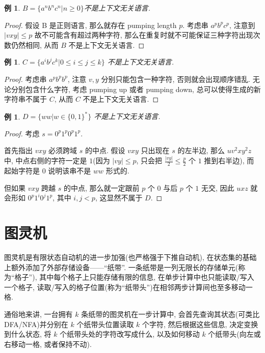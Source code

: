 \documentclass[8pt]{article}
\theoremstyle{compact}
\newtheorem{example}[theorem]{例}
\def\le{\leqslant}
\def\ge{\geqslant}
\begin{document}
\begin{example}
	$B = \{a^nb^nc^n | n \ge 0\}$不是上下文无关语言.
\end{example}
\begin{proof}
	假设 B 是正则语言, 那么就存在 pumping length $p$. 考虑串 $a^pb^pc^p$, 注意到 $|vxy| \le p$ 故不可能含有超过两种字符, 那么在重复时就不可能保证三种字符出现次数仍然相同, 从而 $B$ 不是上下文无关语言.
\end{proof}
\begin{example}
	$C = \{a^ib^jc^k | 0 \le i \le j \le k\}$ 不是上下文无关语言.
\end{example}
\begin{proof}
	考虑串 $a^{p}b^{p}b^{p}$, 注意 $v, y$ 分别只能包含一种字符, 否则就会出现顺序错乱. 无论分别包含什么字符, 考虑 pumping up 或者 pumping down, 总可以使得生成的新字符串不属于 $C$, 从而 $C$ 不是上下文无关语言.
\end{proof}
\begin{example}
	$D = \{ww | w \in \{0, 1\}^*\}$ 不是上下文无关语言. 
\end{example}
\begin{proof}
	考虑 $s = 0^p1^p0^p1^p$. 

	首先指出 $vxy$ 必须跨域 $s$ 的中点. 假设 $vxy$ 只出现在 $s$ 的左半边, 那么 $uv^2xy^2z$ 中, 中点右侧的字符一定是 $1$(因为 $|vy| \le p$, 只会把 $\frac{|vy|}{2} \le \frac p2$ 个 $1$ 推到右半边), 而起始字符是 $0$ 说明该串不是 $ww$ 形式的. 

	但如果 $vxy$ 跨越 $s$ 的中点, 那么就一定跟前 $p$ 个 $0$ 与后 $p$ 个 $1$ 无交, 因此 $uxz$ 就会形如 $0^p1^i0^j1^p$, 其中 $i, j < p$, 这显然不属于 $D$.
\end{proof}

\newpage
\section{图灵机}

图灵机是有限状态自动机的进一步加强(也严格强于下推自动机), 在状态集的基础上额外添加了外部存储设备——“纸带”. 一条纸带是一列无限长的存储单元(称为“格子”), 其中每个格子上只能存储有限的信息, 在单步计算中也只能读取/写入一个格子, 读取/写入的格子位置(称为“纸带头”)在相邻两步计算间也至多移动一格. 

通俗地来讲, 一台拥有 $k$ 条纸带的图灵机在一步计算中, 会首先查询其状态(可类比 DFA/NFA)并分别在 $k$ 个纸带头位置读取 $k$ 个字符, 然后根据这些信息, 决定变换到什么状态, 将 $k$ 个纸带头处的字符改写成什么, 以及如何移动 $k$ 个纸带头(向左或右移动一格, 或者保持不动). 
\end{document}
